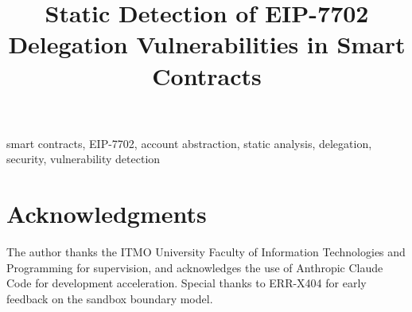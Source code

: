 \documentclass[conference]{IEEEtran}
\begin{document}
\title{Static Detection of EIP-7702 Delegation Vulnerabilities in Smart Contracts}

\author{
}

\maketitle

\begin{abstract}

\end{abstract}

\begin{IEEEkeywords}
smart contracts, EIP-7702, account abstraction, static analysis, delegation, security, vulnerability detection
\end{IEEEkeywords}











\section*{Acknowledgments}
The author thanks the ITMO University Faculty of Information Technologies and Programming for supervision, and acknowledges the use of Anthropic Claude Code for development acceleration. Special thanks to ERR-X404 for early feedback on the sandbox boundary model.

\balance


\end{document}
